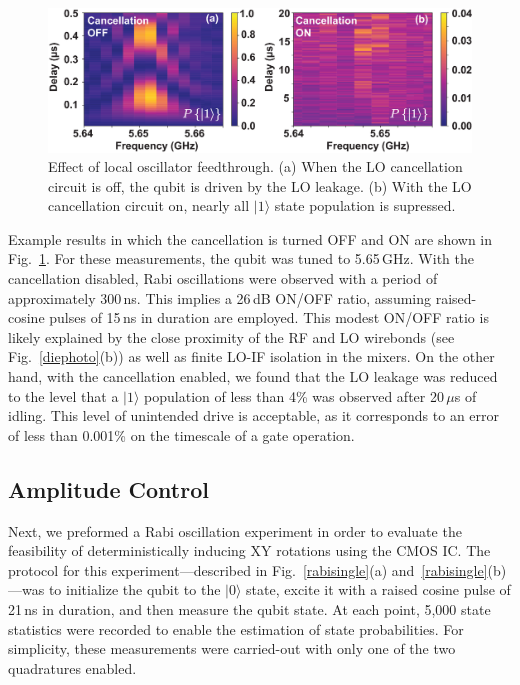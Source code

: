 \documentclass[journal]{IEEEtran}
\newcommand{\CR}[1]{{\color{black}#1}}
\begin{document}
\begin{figure}[bt!]
\includegraphics[width=\columnwidth]{Figures/FIGURE_14}
\caption{Effect of local oscillator feedthrough. (a) When the LO cancellation circuit is off, the qubit is driven by the LO leakage. (b) With the LO cancellation circuit on, nearly all $|1\rangle$ state population is supressed. }\label{LOONOFF}
\end{figure}
Example results in which the cancellation is turned OFF and ON are shown in Fig.~\ref{LOONOFF}. For these measurements, the qubit was tuned to 5.65\,GHz. With the cancellation disabled, Rabi oscillations were observed with a period of approximately 300\,ns. \CR{This implies a 26\,dB ON/OFF ratio, assuming raised-cosine pulses of 15\,ns in duration are employed}. \CR{This modest ON/OFF ratio is likely explained by  the  close proximity of the RF and LO wirebonds (see Fig.~\ref{diephoto}(b)) as well as finite LO-IF isolation in the mixers}. 
On the other hand, with the cancellation enabled, we found that the LO leakage was reduced to the level that a $|1\rangle$ population of less than 4\% was observed after 20\,$\mu$s of idling. This level of unintended drive is  acceptable, as it corresponds to an error of less than \CR{0.001\%} on the timescale of a gate operation. 

\subsection{Amplitude Control}
Next, we preformed a Rabi oscillation experiment in order to evaluate the feasibility of deterministically inducing XY rotations using the CMOS IC. The protocol for this experiment\CR{---}described in Fig.~\ref{rabisingle}(a) and~\ref{rabisingle}(b)\CR{---}was to initialize the qubit to the $|0\rangle$ state, excite it with a raised cosine pulse of \CR{21\,ns} in duration, and then measure the qubit state. \CR{At each point, 5,000 state statistics were recorded to enable the estimation of state probabilities. For simplicity, these measurements were carried-out with only one of the two quadratures enabled.}
\end{document}
